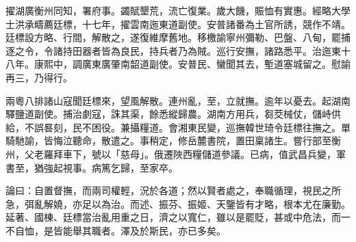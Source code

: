 \begin{pinyinscope}
擢湖廣衡州同知，署府事。蠲賦墾荒，流亡復業。歲大饑，賑恤有實惠。經略大學士洪承疇薦廷標，十七年，擢雲南迤東道副使。安普諸番為土官所誘，競作不靖。廷標設方略、行間，解散之，遂復維摩舊地。移檄諭寧州彌勒、巴盤、八甸，罷捕逐之令，令諸持田器者皆為良民，持兵者乃為賊。巡行安撫，諸路悉平。治迤東十八年。康熙中，調廣東廣肇南韶道副使。安普民、蠻聞其去，塹道塞城留之。慰諭再三，乃得行。

兩粵八排諸山寇聞廷標來，望風解散。連州亂，至，立就撫。逾年以憂去。起湖南驛鹽道副使。捕治劇寇，誅其渠，餘悉縱歸農。湖南方用兵，芻茭械仗，儲峙供給，不誤晷刻，民不困役。兼攝糧道。會湘東民變，巡撫韓世琦令廷標往撫之。單騎馳諭，皆悔泣聽命，散遣之。事稍定，修岳麓書院，置田稟諸生。嘗行部至衡州，父老羅拜車下，號以「慈母」。俄遷陜西糧儲道參議。已病，值武昌兵變，軍書至，猶強起視事。病篤乞歸，至家卒。

論曰：自置督撫，而兩司權輕，況於各道；然以賢者處之，奉職循理，視民之所急，弭亂解嬈，亦足以為治。而述、振芬、振姬、天鑒皆有才略，根本尤在廉勤。延著、國棟、廷標當治亂用重之日，濟之以寬仁，雖以是罷貶，甚或中危法，而一不自恤，是皆能舉其職者。澤及於斯民，亦已多矣。


\end{pinyinscope}